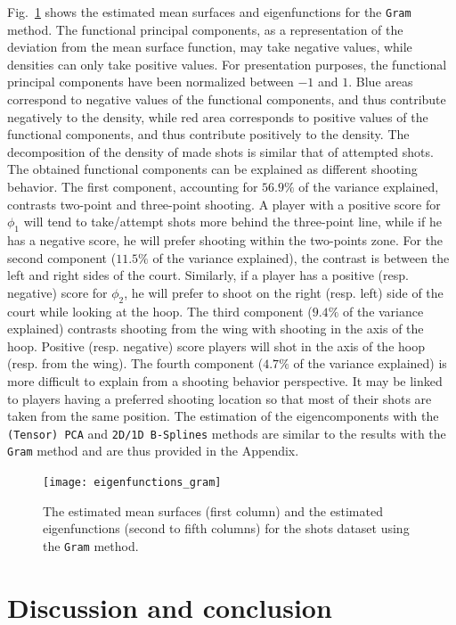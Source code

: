 \documentclass[times,sort&compress,3p]{elsarticle}
\theoremstyle{plain}%
\theoremstyle{definition}
\begin{document}
Fig.~\ref{fig:eigenfunctions_gram} shows the estimated mean surfaces and eigenfunctions for the \texttt{Gram} method. The functional principal components, as a representation of the deviation from the mean surface function, may take negative values, while densities can only take positive values. For presentation purposes, the functional principal components have been normalized between $-1$ and $1$. Blue areas correspond to negative values of the functional components, and thus contribute negatively to the density, while red area corresponds to positive values of the functional components, and thus contribute positively to the density. The decomposition of the density of made shots is similar that of attempted shots. The obtained functional components can be explained as different shooting behavior. The first component, accounting for $56.9\%$ of the variance explained, contrasts two-point and three-point shooting. A player with a positive score for $\phi_1$ will tend to take/attempt shots more behind the three-point line, while if he has a negative score, he will prefer shooting within the two-points zone. For the second component ($11.5\%$ of the variance explained), the contrast is between the left and right sides of the court. Similarly, if a player has a positive (resp. negative) score for $\phi_2$, he will prefer to shoot on the right (resp. left) side of the court while looking at the hoop. The third component ($9.4\%$ of the variance explained) contrasts shooting from the wing with shooting in the axis of the hoop. Positive (resp. negative) score players will shot in the axis of the hoop (resp. from the wing). The fourth component ($4.7\%$ of the variance explained) is more difficult to explain from a shooting behavior perspective. It may be linked to players having a preferred shooting location so that most of their shots are taken from the same position. The estimation of the eigencomponents with the \texttt{(Tensor) PCA} and \texttt{2D/1D B-Splines} methods are similar to the results with the \texttt{Gram} method and are thus provided in the Appendix. 
\begin{figure}
    \centering
    \texttt{[image: eigenfunctions\_gram]}
    \caption{The estimated mean surfaces (first column) and the estimated eigenfunctions (second to fifth columns) for the shots dataset using the \texttt{Gram} method.}
    \label{fig:eigenfunctions_gram}
\end{figure}


\section{Discussion and conclusion} %
\label{sec:discussion}
\end{document}
